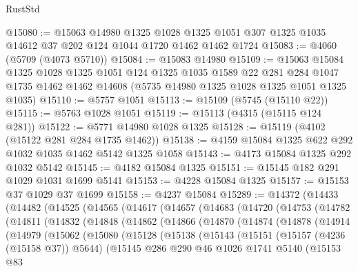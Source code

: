 \begin{lexlean}{RustStd}
\begin{coremodule}
@15080 := @15063
    @14980
    @1325
    @1028
    @1325
    @1051
    @307
    @1325
    @1035
    @14612
    @37
    @202
    @124
    @1044
    @1720
    @1462
    @1462
    @1724
@15083 := @4060 (@5709 (@4073 @5710))
@15084 := @15083 @14980
@15109 := @15063
    @15084
    @1325
    @1028
    @1325
    @1051
    @124
    @1325
    @1035
    @1589
    @22
    @281
    @284
    @1047
    @1735
    @1462
    @1462
    @14608
    (@5735 @14980 @1325 @1028 @1325 @1051 @1325 @1035)
@15110 := @5757 @1051
@15113 := @15109 (@5745 (@15110 @22))
@15115 := @5763 @1028 @1051
@15119 := @15113 (@4315 (@15115 @124 @281))
@15122 := @5771 @14980 @1028 @1325
@15128 := @15119 (@4102 (@15122 @281 @284 @1735 @1462))
@15138 := @4159 @15084 @1325 @622 @292 @1032 @1035 @1462 @5142 @1325 @1058
@15143 := @4173 @15084 @1325 @292 @1032 @5142
@15145 := @4182 @15084 @1325
@15151 := @15145 @182 @291 @1029 @1031 @1699 @5141
@15153 := @4228 @15084 @1325
@15157 := @15153 @37 @1029 @37 @1699
@15158 := @4237 @15084
@15289 := @14372
    (@14433
      (@14482
        (@14525
          (@14565
            (@14617
              (@14657
                (@14683
                  (@14720
                    (@14753
                      (@14782
                        (@14811
                          (@14832
                            (@14848
                              (@14862
                                (@14866
                                  (@14870
                                    (@14874
                                      (@14878
                                        (@14914
                                          (@14979
                                            (@15062
                                              (@15080
                                                (@15128
                                                  (@15138
                                                    (@15143
                                                      (@15151
                                                        (@15157 (@4236 (@15158 @37)) @5644)
                                                        (@15145
                                                          @286
                                                          @290
                                                          @46
                                                          @1026
                                                          @1741
                                                          @5140
                                                          (@15153
                                                            @83

\end{coremodule}
\end{lexlean}
